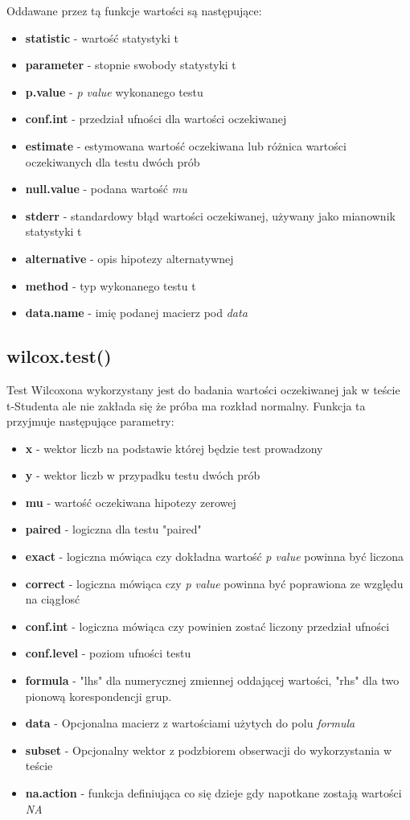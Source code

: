 \documentclass{article}
\begin{document}
Oddawane przez tą funkcje wartości są następujące:
\begin{itemize}
\item \textbf{statistic} - wartość statystyki t
\item \textbf{parameter} - stopnie swobody statystyki t
\item \textbf{p.value} - \textit{p value} wykonanego testu
\item \textbf{conf.int} - przedział ufności dla wartości oczekiwanej
\item \textbf{estimate} - estymowana wartość oczekiwana lub różnica wartości oczekiwanych dla testu dwóch prób
\item \textbf{null.value} - podana wartość \textit{mu}
\item \textbf{stderr} - standardowy błąd wartości oczekiwanej, używany jako mianownik statystyki t
\item \textbf{alternative} - opis hipotezy alternatywnej
\item \textbf{method} - typ wykonanego testu t
\item \textbf{data.name} - imię podanej macierz pod \textit{data}
\end{itemize}

\subsection{wilcox.test()}
Test Wilcoxona wykorzystany jest do badania wartości oczekiwanej jak w teście t-Studenta ale nie zakłada się że próba ma rozkład normalny. Funkcja ta przyjmuje następujące parametry:
\begin{itemize}
\item \textbf{x} - wektor liczb na podstawie której będzie test prowadzony
\item \textbf{y} - wektor liczb w przypadku testu dwóch prób
\item \textbf{mu} - wartość oczekiwana hipotezy zerowej
\item \textbf{paired} - logiczna dla testu "paired"
\item \textbf{exact} - logiczna mówiąca czy dokładna wartość \textit{p value} powinna być liczona
\item \textbf{correct} - logiczna mówiąca czy \textit{p value} powinna być poprawiona ze względu na ciągłosć
\item \textbf{conf.int} - logiczna mówiąca czy powinien zostać liczony przedział ufności
\item \textbf{conf.level} - poziom ufności testu
\item \textbf{formula} - "lhs" dla numerycznej zmiennej oddającej wartości, "rhs" dla two pionową korespondencji grup.
\item \textbf{data} - Opcjonalna macierz z wartościami użytych do polu \textit{formula}
\item \textbf{subset}  - Opcjonalny wektor z podzbiorem obserwacji do wykorzystania w teście
\item \textbf{na.action} - funkcja definiująca co się dzieje gdy napotkane zostają wartości \textit{NA}
\end{itemize}
\end{document}
